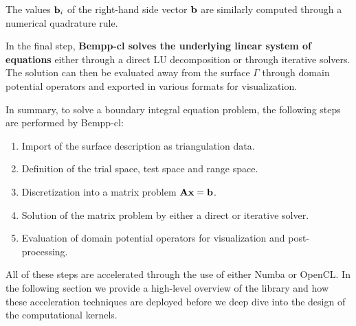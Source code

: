 The values $\mathbf{b}_i$ of the right-hand side vector $\mathbf{b}$ are similarly computed through a numerical quadrature rule.

In the final step, \textbf{Bempp-cl solves the underlying linear system of equations} either through a direct LU decomposition or through iterative solvers. The solution can then be evaluated away from the surface $\Gamma$ through domain potential operators and exported in various formats for visualization.

In summary, to solve a boundary integral equation problem, the following steps are performed by Bempp-cl:
\begin{enumerate}
	\item Import of the surface description as triangulation data.
	\item Definition of the trial space, test space and range space.
	\item Discretization into a matrix problem $\mathbf{A}\mathbf{x}=\mathbf{b}$.
	\item Solution of the matrix problem by either a direct or iterative solver.
	\item Evaluation of domain potential operators for visualization and post-processing.
\end{enumerate}

All of these steps are accelerated through the use of either Numba or OpenCL. In the following section we provide a high-level overview of the library and how these acceleration techniques are deployed before we deep dive into the design of the computational kernels.
